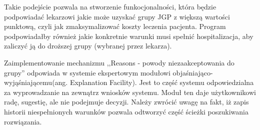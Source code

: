Takie podejście pozwala na stworzenie funkocjonalności, która będzie podpowiadać lekarzowi jakie może uzyskać grupy JGP z większą wartości punktową, czyli jak zmaksymalizować koszty leczenia pacjenta. Program podpowiadałby również jakie konkretnie warunki musi spełnić hospitalizacja, aby zaliczyć ją do droższej grupy (wybranej przez lekarza).

Zaimplementowanie mechanizmu ,,Reasons - powody niezaakceptowania do grupy'' odpowiada w systemie ekspertowym modułowi objaśniająco-wyjąśniającemu(ang. Explanation Facility). Jest to część systemu odpowiedzialna za wyprowadzanie na zewnątrz wniosków systemu. Moduł ten daje użytkownikowi radę, sugestię, ale nie podejmuje decyzji\cite{martyniuk_ekspertowe}. Należy zwrócić uwagę na fakt, iż zapis historii niespełnionych warunków pozwala odtworzyć część ścieżki poszukiwania rozwiązania.
